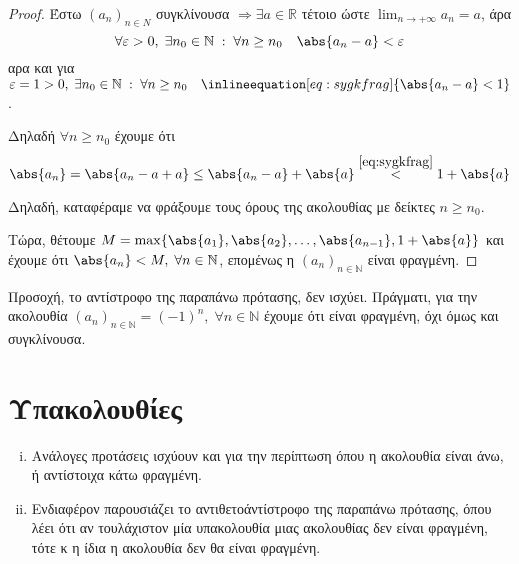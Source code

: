 \documentclass[main.tex]{subfiles}
\begin{document}


\begin{proof}
    Έστω $ (a_{n})_{n \in \mathbb{Ν}} $ συγκλίνουσα $ \Rightarrow 
    \exists a \in \mathbb{R} $ τέτοιο ώστε $ \lim_{n \to +\infty} a_{n}
    =a $, άρα 
    \[
        \forall \varepsilon > 0, \; \exists n_{0} \in \mathbb{N} \; 
        : \; \forall n \geq n_{0}\quad \abs{a_{n}-a} < \varepsilon  
    \] 
    αρα και για $ \varepsilon =1>0, \; \exists n_{0} \in \mathbb{N} \; 
    : \; \forall n \geq n_{0} \quad 
    \inlineequation[eq:sygkfrag]{\abs{a_{n}-a} < 1} $. 

    Δηλαδή $ \forall n \geq n_{0} $ έχουμε ότι 
    \[
        \abs{a_{n}} = \abs{a_{n}-a + a} \leq \abs{a_{n} - a} + \abs{a} 
        \overset{\eqref{eq:sygkfrag}}{<} 1 + \abs{a}  
    \] 

    Δηλαδή, καταφέραμε να φράξουμε τους όρους της ακολουθίας με δείκτες 
    $n \geq n_{0} $.

    Τώρα, θέτουμε $ M = \max \{ \abs{a_{1}} , \abs{a_{2}} , \ldots, 
    \abs{a_{n-1}} , 1 + \abs{a}\} $ και έχουμε ότι $ \abs{a_{n}} 
    < M, \; \forall n \in \mathbb{N} $, επομένως η 
    $ (a_{n})_{n \in \mathbb{N}} $ είναι φραγμένη.
\end{proof}

\begin{rem}
    Προσοχή, το αντίστροφο της παραπάνω πρότασης, δεν ισχύει. Πράγματι, 
    για την  ακολουθία $ (a_{n})_{n \in \mathbb{N}} = (-1)^{n}, \; 
    \forall n \in \mathbb{N} $ έχουμε ότι είναι φραγμένη, όχι όμως και 
    συγκλίνουσα.
\end{rem}

\section{Υπακολουθίες}




\begin{rem}
\item {}
    \begin{enumerate}[i)]
        \item Ανάλογες προτάσεις ισχύουν και για την περίπτωση όπου η 
            ακολουθία είναι άνω, ή αντίστοιχα κάτω φραγμένη.
        \item 
            Ενδιαφέρον παρουσιάζει το αντιθετοάντίστροφο της παραπάνω 
            πρότασης, όπου λέει ότι αν τουλάχιστον μία υπακολουθία μιας 
            ακολουθίας δεν είναι φραγμένη, τότε κ η ίδια η ακολουθία 
            δεν θα είναι φραγμένη.
    \end{enumerate}
\end{rem}
\end{document}
